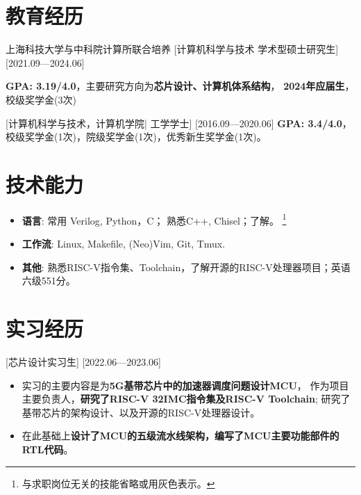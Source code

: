 \documentclass{resume}
\begin{document}

\ResumeTitle

\section{教育经历}
\ResumeItem
{上海科技大学与中科院计算所联合培养}
[\textnormal{计算机科学与技术}  学术型硕士研究生]
[2021.09—2024.06]

\textbf{GPA: 3.19/4.0}，主要研究方向为\textbf{芯片设计、计算机体系结构}，
\textbf{2024年应届生}，校级奖学金(3次)

[\textnormal{计算机科学与技术，计算机学院|} 工学学士]
[2016.09—2020.06]
\textbf{GPA: 3.4/4.0}，校级奖学金(1次)，院级奖学金(1次)，优秀新生奖学金(1次)。

\section{技术能力}
\begin{itemize}
  \item \textbf{语言}: 常用 Verilog, Python，C； 熟悉C++, Chisel；了解。
      \footnote{与求职岗位无关的技能省略或用灰色表示。}
  \item \textbf{工作流}: Linux, Makefile, (Neo)Vim, Git, Tmux.
  \item \textbf{其他}: 熟悉RISC-V指令集、Toolchain，了解开源的RISC-V处理器项目；英语六级551分。
\end{itemize}

\section{实习经历}

[芯片设计实习生]
[2022.06—2023.06] 
\begin{itemize}
    \item 实习的主要内容是为\textbf{5G基带芯片中的加速器调度问题设计MCU}，
        作为项目主要负责人，\textbf{研究了RISC-V 32IMC指令集及RISC-V Toolchain};
        研究了基带芯片的架构设计、以及开源的RISC-V处理器设计。
    \item 在此基础上\textbf{设计了MCU的五级流水线架构，编写了MCU主要功能部件的RTL代码}。
\end{itemize}
\end{document}
